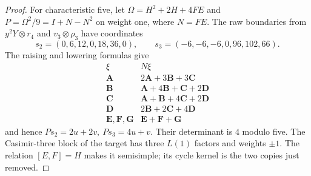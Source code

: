\documentclass[11pt]{article}
\theoremstyle{plain}
\theoremstyle{definition}
\theoremstyle{remark}
\numberwithin{equation}{section}
\begin{document}
\begin{proof}
For characteristic five, let \(\Omega=H^2+2H+4FE\) and
\(P=\Omega^2/9=I+N-N^2\) on weight one, where \(N=FE\).
The raw boundaries from \(y^2Y\otimes r_4\) and \(v_3\otimes\rho_3\) have
coordinates
\[
 s_2=(0,6,12,0,18,36,0),\qquad
 s_3=(-6,-6,-6,0,96,102,66).
\]
The raising and lowering formulas give
\[
\begin{array}{c|l}
 \xi&N\xi\\\hline
 \mathbf A&2\mathbf A+3\mathbf B+3\mathbf C\\
 \mathbf B&\mathbf A+4\mathbf B+\mathbf C+2\mathbf D\\
 \mathbf C&\mathbf A+\mathbf B+4\mathbf C+2\mathbf D\\
 \mathbf D&2\mathbf B+2\mathbf C+4\mathbf D\\
 \mathbf E,\mathbf F,\mathbf G&\mathbf E+\mathbf F+\mathbf G
\end{array}
\]
and hence \(Ps_2=2u+2v,\ Ps_3=4u+v\).
Their determinant is \(4\) modulo five.
The Casimir-three block of the target has three \(L(1)\) factors and
weights \(\pm1\). The relation \([E,F]=H\) makes it semisimple;
its cycle kernel is the two copies just removed.


\end{proof}
\end{document}
